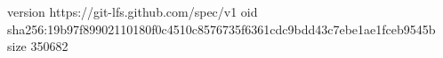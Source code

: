 version https://git-lfs.github.com/spec/v1
oid sha256:19b97f89902110180f0c4510c8576735f6361cdc9bdd43c7ebe1ae1fceb9545b
size 350682
